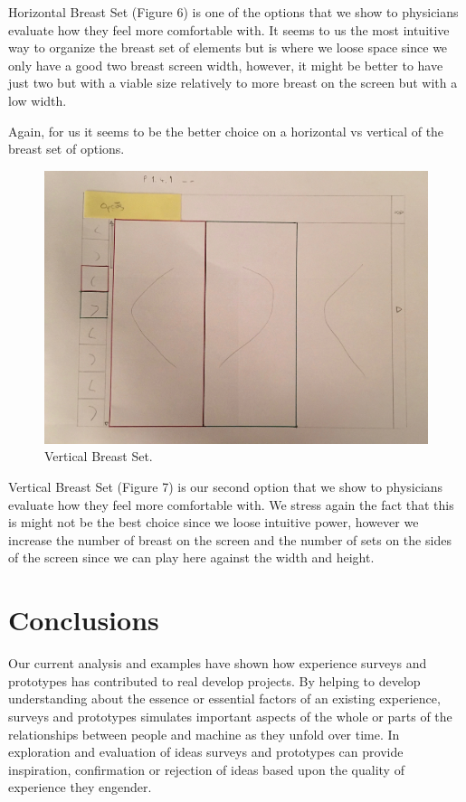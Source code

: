 Horizontal Breast Set (Figure 6) is one of the options that we show to physicians evaluate how they feel more comfortable with. It seems to us the most intuitive way to organize the breast set of elements but is where we loose space since we only have a good two breast screen width, however, it might be better to have just two but with a viable size relatively to more breast on the screen but with a low width.

Again, for us it seems to be the better choice on a horizontal vs vertical of the breast set of options.

\clearpage

\begin{figure}[!hbt]
\centering
\includegraphics[width=1.00\textwidth]{p141.png}
\caption{\label{fig:P 1.4.1}Vertical Breast Set.
}
\end{figure}

Vertical Breast Set (Figure 7) is our second option that we show to physicians evaluate how they feel more comfortable with. We stress again the fact that this is might not be the best choice since we loose intuitive power, however we increase the number of breast on the screen and the number of sets on the sides of the screen since we can play here against the width and height.

\clearpage

\section{Conclusions}

Our current analysis and examples have shown how experience surveys and prototypes has contributed to real develop projects. By helping to develop understanding about the essence or essential factors of an existing experience, surveys and prototypes simulates important aspects of the whole or parts of the relationships between people and machine as they unfold over time. In exploration and evaluation of ideas surveys and prototypes can provide inspiration, confirmation or rejection of ideas based upon the quality of experience they engender.

